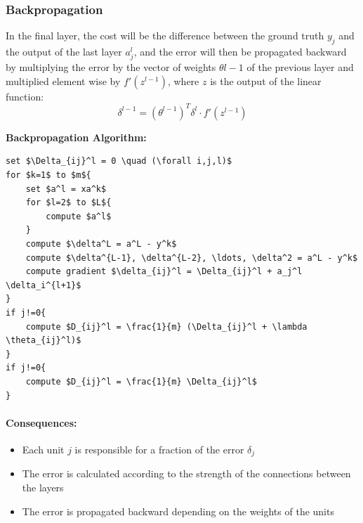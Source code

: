 \subsubsection{Backpropagation}
In the final layer, the cost will be the difference between the ground truth $y_j$ and the output of the last layer $a_j^l$, and the error will then be propagated backward by multiplying the error by the vector of weights $\theta{l-1}$ of the previous layer and multiplied element wise by $f'(z^{l-1})$, where $z$ is the output of the linear function:
\begin{equation} \tag*{}
    \delta^{l-1} = (\theta^{l-1})^T \delta^{l} \cdot f'(z^{l-1})
\end{equation}

\raggedright
\textbf{Backpropagation Algorithm:}
\begin{lstlisting}[mathescape=true]
set $\Delta_{ij}^l = 0 \quad (\forall i,j,l)$
for $k=1$ to $m${
    set $a^l = xa^k$
    for $l=2$ to $L${
        compute $a^l$
    }
    compute $\delta^L = a^L - y^k$
    compute $\delta^{L-1}, \delta^{L-2}, \ldots, \delta^2 = a^L - y^k$
    compute gradient $\delta_{ij}^l = \Delta_{ij}^l + a_j^l \delta_i^{l+1}$
}
if j!=0{
    compute $D_{ij}^l = \frac{1}{m} (\Delta_{ij}^l + \lambda \theta_{ij}^l)$
}
if j!=0{
    compute $D_{ij}^l = \frac{1}{m} \Delta_{ij}^l$
}
\end{lstlisting}
\paragraph{Consequences:}
\begin{itemize}
    \item Each unit $j$ is responsible for a fraction of the error $\delta_j$
    \item The error is calculated according to the strength of the connections between the layers
    \item The error is propagated backward depending on the weights of the units
\end{itemize}

\newpage
